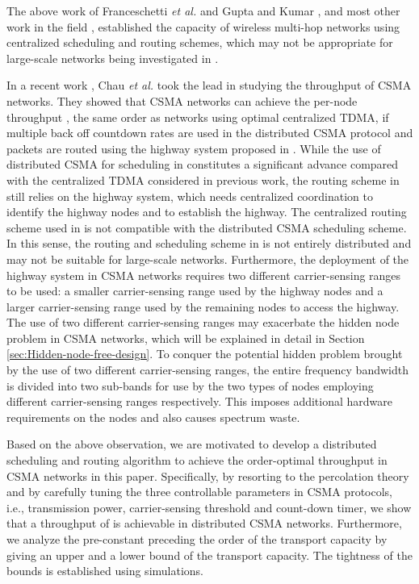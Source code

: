 \documentclass[english]{IEEEtran}
\theoremstyle{plain}
\theoremstyle{plain}
\theoremstyle{plain}
\theoremstyle{remark}
\begin{document}
The above work of Franceschetti \emph{et al.} \cite{Franceschetti07Closing}
and Gupta and Kumar \cite{Gupta00Capacity,Xie04A}, and most other
work in the field \cite{Alfano09Capacity,Cho06Capacity,Dousse06On,Hu10A,Kulkarni04A,Li09Impacts,Li11The},
established the capacity of wireless multi-hop networks using centralized
scheduling and routing schemes, which may not be appropriate for large-scale
networks being investigated in \cite{Franceschetti07Closing,Gupta00Capacity,Xie04A}. 

In a recent work \cite{Chau11Capacity}, Chau \emph{et al.} took the
lead in studying the throughput of CSMA networks. They showed that
CSMA networks can achieve the per-node throughput ,
the same order as networks using optimal centralized TDMA, if multiple
back off countdown rates are used in the distributed CSMA protocol
and packets are routed using the highway system proposed in \cite{Franceschetti07Closing}.
While the use of distributed CSMA for scheduling in \cite{Chau11Capacity}
constitutes a significant advance compared with the centralized TDMA
considered in previous work, the routing scheme in \cite{Chau11Capacity}
still relies on the highway system, which needs centralized coordination
to identify the highway nodes and to establish the highway. The centralized
routing scheme used in \cite{Chau11Capacity} is not compatible with
the distributed CSMA scheduling scheme. In this sense, the routing
and scheduling scheme in \cite{Chau11Capacity} is not entirely distributed
and may not be suitable for large-scale networks. Furthermore, the
deployment of the highway system in CSMA networks requires two different
carrier-sensing ranges to be used: a smaller carrier-sensing range
used by the highway nodes and a larger carrier-sensing range used
by the remaining nodes to access the highway. The use of two different
carrier-sensing ranges may exacerbate the hidden node problem in CSMA
networks, which will be explained in detail in Section \ref{sec:Hidden-node-free-design}.
To conquer the potential hidden problem brought by the use of two
different carrier-sensing ranges, the entire frequency bandwidth is
divided into two sub-bands for use by the two types of nodes employing
different carrier-sensing ranges respectively. This imposes additional
hardware requirements on the nodes and also causes spectrum waste.

Based on the above observation, we are motivated to develop a distributed
scheduling and routing algorithm to achieve the order-optimal throughput
in CSMA networks in this paper. Specifically, by resorting to the
percolation theory and by carefully tuning the three controllable
parameters in CSMA protocols, i.e., transmission power, carrier-sensing
threshold and count-down timer, we show that a throughput of 
is achievable in distributed CSMA networks. Furthermore, we analyze
the pre-constant preceding the order of the transport capacity by
giving an upper and a lower bound of the transport capacity. The tightness
of the bounds is established using simulations.
\end{document}
